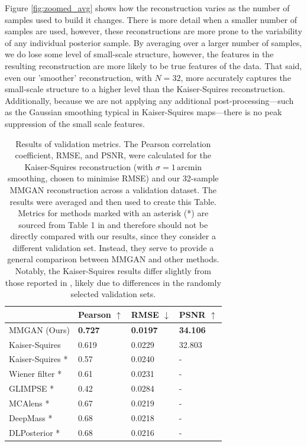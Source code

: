 \documentclass[fleqn,usenatbib]{mnras}
\begin{document}
Figure \ref{fig:zoomed_avg} shows how the reconstruction varies as the number of samples used to build it changes. There is more detail when a 
smaller number of samples are used, however, these reconstructions are more prone to the variability of any individual posterior sample. By averaging 
over a larger number of samples, we do lose some level of small-scale structure, however, the features in the resulting reconstruction are more 
likely to be true features of the data. That said, even our 'smoother' reconstruction, with $N=32$, more accurately captures the small-scale structure to a higher level 
than the Kaiser-Squires reconstruction. Additionally, because we are not applying any additional post-processing---such as the Gaussian smoothing typical in Kaiser-Squires maps---there is no peak suppression of the small scale features.

\begin{table}
	\centering
	\caption{Results of validation metrics. The Pearson correlation coefficient, RMSE, and PSNR, were calculated for the Kaiser-Squires reconstruction (with $\sigma = 1 \, \text{arcmin}$ smoothing, chosen to minimise RMSE) and our 32-sample MMGAN reconstruction across a validation dataset. The results were averaged and then used to create this Table. Metrics for methods marked with an asterisk (*) are sourced from Table 1 in \citet{remy2023probabilistic} and therefore should not be directly compared with our results, since they consider a different validation set. Instead, they serve to provide a general comparison between MMGAN and other methods. Notably, the Kaiser-Squires results differ slightly from those reported in \citet{remy2023probabilistic}, likely due to differences in the randomly selected validation sets.}
	\begin{tabular}{|l|l|l|l|}
		\toprule
		  & Pearson $\uparrow$ & RMSE $\downarrow$ & PSNR $\uparrow$  \\
		\midrule
		MMGAN (Ours) & \textbf{0.727} & \textbf{0.0197} & \textbf{34.106} \\
		Kaiser-Squires & 0.619 & 0.0229 & 32.803 \\
		\midrule
		Kaiser-Squires * & 0.57 & 0.0240 & - \\
		Wiener filter * & 0.61 & 0.0231 & - \\
		GLIMPSE * & 0.42 & 0.0284 & - \\
		MCAlens * & 0.67 & 0.0219 & - \\
		DeepMass * & 0.68 & 0.0218 & - \\
		DLPosterior * & 0.68 & 0.0216 & - \\
		\bottomrule
	\end{tabular}
	\label{table:best_epoch}
\end{table}
\end{document}
